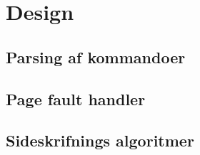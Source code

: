 \section{Design}

\subsection{Parsing af kommandoer}

\subsection{Page fault handler}

\subsection{Sideskrifnings algoritmer}


